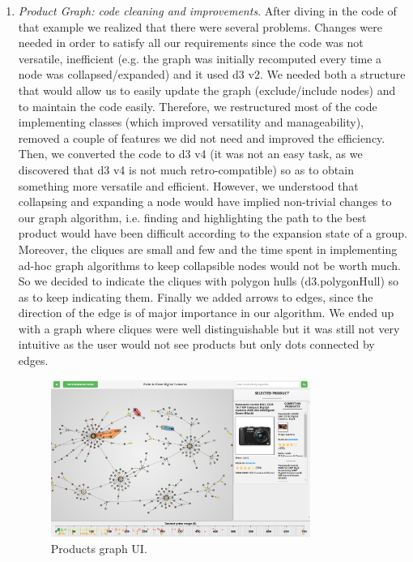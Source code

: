 \documentclass[a4paper,12pt]{article}
\begin{document}
\begin{enumerate}
	\item \textit{Product Graph: code cleaning and improvements}. After diving in the code of that example we realized that there were several problems. Changes were needed in order to satisfy all our requirements since the code was not versatile, inefficient (e.g. the graph was initially recomputed every time a node was collapsed/expanded) and it used d3 v2. We needed both a structure that would allow us to easily update the graph (exclude/include nodes) and to maintain the code easily. Therefore, we restructured most of the code implementing classes (which improved versatility and manageability), removed a couple of features we did not need and improved the efficiency. Then, we converted the code to d3 v4 (it was not an easy task, as we discovered that d3 v4 is not much retro-compatible) so as to obtain something more versatile and efficient. However, we understood that collapsing and expanding a node would have implied non-trivial changes to our graph algorithm, i.e. finding and highlighting the path to the best product would have been difficult according to the expansion state of a group. Moreover, the cliques are small and few and the time spent in implementing ad-hoc graph algorithms to keep collapsible nodes would not be worth much. So we decided to indicate the cliques with polygon hulls (d3.polygonHull) so as to keep indicating them. Finally we added arrows to edges, since the direction of the edge is of major importance in our algorithm.  We ended up with a graph where cliques were well distinguishable but it was still not very intuitive as the user would not see products but only dots connected by edges.
	
		\begin{figure}[H]
			\centering{}
			\includegraphics[width=0.8\textwidth]{img/products_graph.png}
			\caption{Products graph UI.}
			\label{fig:products_graph}
		\end{figure}


\end{enumerate}
\end{document}
